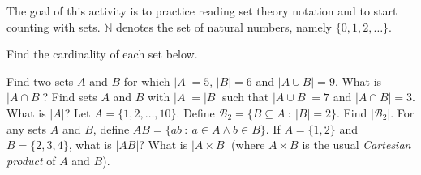 \documentclass[11pt]{exam}
\def\N{\mathbb{N}}
\def\st{~:~}
\begin{document}
\noindent The goal of this activity is to practice reading set theory notation and to start counting with sets.  $\N$ denotes the set of natural numbers, namely $\{0,1,2,\ldots\}$.


\begin{questions}

\question Find the cardinality of each set below.

\question Find two sets $A$ and $B$ for which $|A| = 5$, $|B| = 6$ and $|A\cup B| = 9$.  What is $|A \cap B|$? 
\vfill
\question Find sets $A$ and $B$ with $|A| = |B|$ such that $|A\cup B| = 7$ and $|A \cap B| = 3$.  What is $|A|$?
\vfill
\newpage
\question Let $A = \{1,2,\ldots, 10\}$.  Define $\mathcal{B}_2 = \{B \subseteq A \st |B| = 2\}$.  Find $|\mathcal{B}_2|$.
\vfill
\question For any sets $A$ and $B$, define $AB = \{ab \st a\in A \wedge b \in B\}$.  If $A = \{1,2\}$ and $B = \{2,3,4\}$, what is $|AB|$?  What is $|A \times B|$ (where $A \times B$ is the usual {\em Cartesian product} of $A$ and $B$). 
\vfill
\end{questions}
\newpage
\end{document}
